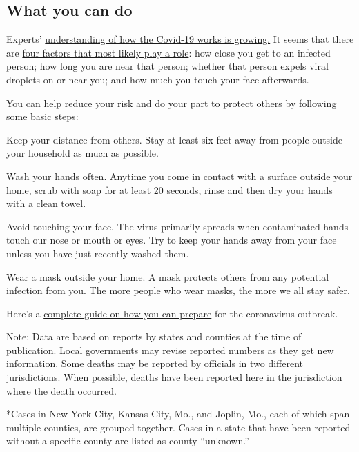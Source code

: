 \hypertarget{what-you-can-do}{%
\subsection{What you can do}\label{what-you-can-do}}

Experts'
\href{https://www.nytimes3xbfgragh.onion/2020/06/02/health/coronavirus-profile-covid.html}{understanding
of how the Covid-19 works is growing.} It seems that there are
\href{https://www.nytimes3xbfgragh.onion/2020/03/02/health/coronavirus-how-it-spreads.html}{four
factors that most likely play a role}: how close you get to an infected
person; how long you are near that person; whether that person expels
viral droplets on or near you; and how much you touch your face
afterwards.

You can help reduce your risk and do your part to protect others by
following some
\href{https://www.nytimes3xbfgragh.onion/article/prepare-for-coronavirus.html?action=click\&pgtype=Article\&state=default\&module=styln-coronavirus\&variant=show®ion=TOP_BANNER\&context=storyline_menu\#link-56871453}{basic
steps}:

Keep your distance from others. Stay at least six feet away from people
outside your household as much as possible.

Wash your hands often. Anytime you come in contact with a surface
outside your home, scrub with soap for at least 20 seconds, rinse and
then dry your hands with a clean towel.

Avoid touching your face. The virus primarily spreads when contaminated
hands touch our nose or mouth or eyes. Try to keep your hands away from
your face unless you have just recently washed them.

Wear a mask outside your home. A mask protects others from any potential
infection from you. The more people who wear masks, the more we all stay
safer.

Here's a
\href{https://www.nytimes3xbfgragh.onion/interactive/2020/world/coronavirus-tips-advice.html}{complete
guide on how you can prepare} for the coronavirus outbreak.

Note: Data are based on reports by states and counties at the time of
publication. Local governments may revise reported numbers as they get
new information. Some deaths may be reported by officials in two
different jurisdictions. When possible, deaths have been reported here
in the jurisdiction where the death occurred.

*Cases in New York City, Kansas City, Mo., and Joplin, Mo., each of
which span multiple counties, are grouped together. Cases in a state
that have been reported without a specific county are listed as county
``unknown.''

